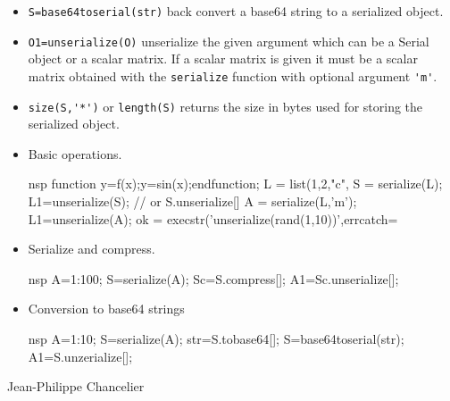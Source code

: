 \begin{itemize}
  \item \verb+S=base64toserial(str)+ back convert a base64 string to a serialized object. 
  \item \verb+O1=unserialize(O)+ unserialize the given argument which can be a Serial object or a scalar matrix. 
    If a scalar matrix is given it must be a scalar matrix obtained with the \verb+serialize+ function with 
    optional argument \verb+'m'+. 
  \item \verb+size(S,'*')+ or \verb+length(S)+ returns the size in bytes used for storing the serialized object.
\end{itemize}

\begin{examples}
\begin{itemize}
\item Basic operations.
\begin{mintednsp}{nsp}
  function y=f(x);y=sin(x);endfunction;
  L = list(1,2,"c",%
  S = serialize(L);
  L1=unserialize(S); // or S.unserialize[]
  A = serialize(L,'m');
  L1=unserialize(A);
  ok = execstr('unserialize(rand(1,10))',errcatch=%
\end{mintednsp}
\item Serialize and compress.
\begin{mintednsp}{nsp}
  A=1:100;
  S=serialize(A);
  Sc=S.compress[];
  A1=Sc.unserialize[];
\end{mintednsp}
\item Conversion to base64 strings 
\begin{mintednsp}{nsp}
  A=1:10;
  S=serialize(A);
  str=S.tobase64[];
  S=base64toserial(str);
  A1=S.unzerialize[];
\end{mintednsp}
\end{itemize}
\end{examples}

\begin{manseealso}
\end{manseealso}

\begin{authors}
   Jean-Philippe Chancelier
\end{authors}
